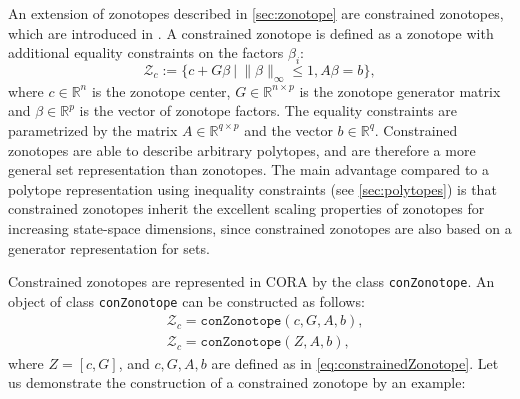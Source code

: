  \label{sec:conZonotope}

An extension of zonotopes described in \cref{sec:zonotope} are constrained zonotopes, which are introduced in \cite{Scott2016}. A constrained zonotope is defined as a zonotope with additional equality constraints on the factors $\beta_i$:
\begin{equation} \label{eq:constrainedZonotope}
	\mathcal{Z}_c := \Big\{ c + G \beta ~\Big|~ \lVert \beta \rVert_{\infty} \leq 1, A \beta = b \Big\}, 
\end{equation}
where $c \in \mathbb{R}^n$ is the zonotope center, $G \in \mathbb{R}^{n \times p}$ is the zonotope generator matrix and $\beta \in \mathbb{R}^p$ is the vector of zonotope factors. The equality constraints are parametrized by the matrix $A \in \mathbb{R}^{q \times p}$ and the vector $b \in \mathbb{R}^q$. Constrained zonotopes are able to describe arbitrary polytopes, and are therefore a more general set representation than zonotopes. The main advantage compared to a polytope representation using inequality constraints (see \cref{sec:polytopes}) is that constrained zonotopes inherit the excellent scaling properties of zonotopes for increasing state-space dimensions, since constrained zonotopes are also based on a generator representation for sets.

Constrained zonotopes are represented in CORA by the class \texttt{conZonotope}. An object of class \texttt{conZonotope} can be constructed as follows:
\begin{equation*}
	\begin{split}
		& \mathcal{Z}_c = \texttt{conZonotope}(c,G,A,b), \\
		& \mathcal{Z}_c = \texttt{conZonotope}(Z,A,b),
	\end{split}
\end{equation*} 
where $Z = [c,G]$, and $c,G,A,b$ are defined as in \eqref{eq:constrainedZonotope}. Let us demonstrate the construction of a constrained zonotope by an example:

\begin{center}
\begin{minipage}[t]{0.5\textwidth}
	\vspace{20pt}
	\footnotesize
	
\end{minipage}
\begin{minipage}[t]{0.3\textwidth}
    \vspace{0pt}
    \centering
\end{minipage}
\end{center}

